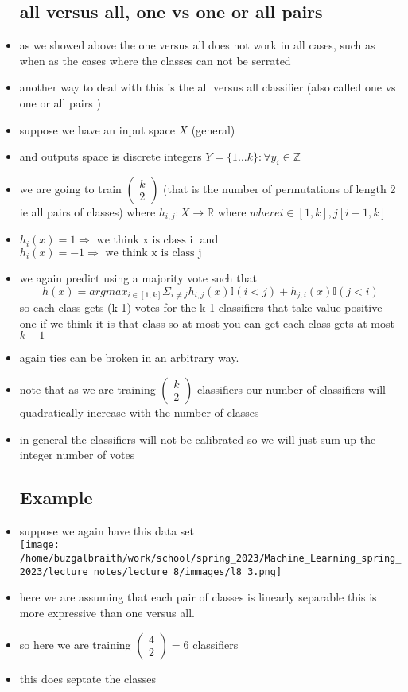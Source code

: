 \documentclass{article}
\begin{document}
\begin{itemize}
\subsection*{all versus all, one vs one or all pairs}
\item as we showed above the one versus all does not work in all cases, such as when as the cases where the classes can not be serrated 
\item another way to deal with this is the all versus all classifier (also called one vs one or all pairs )

\item suppose we have an input space $X$ (general)
\item and outputs space is discrete integers $Y=\{1...k\}:\forall y_i\in \mathbb{Z}$
\item we are going to train $\begin{pmatrix}k\\2
\end{pmatrix}$ (that is the number of permutations of length 2 ie all pairs of classes) where $h_{i,j}:X\rightarrow \mathbb{R} $  where $where i\in [1,k], j[i+1,k]$
\item  $h_i(x)=1\Rightarrow \text{ we think x is class i } $ and $h_i(x)=-1\Rightarrow \text{ we think x is class j } $  
\item we again predict using a majority vote such that 
$$h(x)=argmax_{i\in [1,k]}\Sigma_{i\neq j}h_{i,j}(x)\mathbb{I}(i<j)+h_{j,i}(x)\mathbb{I}(j<i)
$$ 
so each class gets (k-1) votes for the k-1 classifiers that take value positive one if we think it is that class so at most you can get each class gets at most $k-1$ 
\item again ties can be broken in an arbitrary way. 
\item note that as we are training $\begin{pmatrix}k\\2
\end{pmatrix}$ classifiers our number of classifiers will quadratically increase with the number of classes 
\item in general the classifiers will not be calibrated so we will just sum up the integer number of votes
\subsection*{Example}
\item suppose we again have this data set 
 \\ \texttt{[image: /home/buzgalbraith/work/school/spring\_2023/Machine\_Learning\_spring\_2023/lecture\_notes/lecture\_8/immages/l8\_3.png]}
\item here we are assuming that each pair of classes is linearly separable this is more expressive than one versus all.
\item   so here we are training $\begin{pmatrix}4\\2
\end{pmatrix}=6$ classifiers 
\item this does septate the classes 

\end{itemize}
\end{document}
